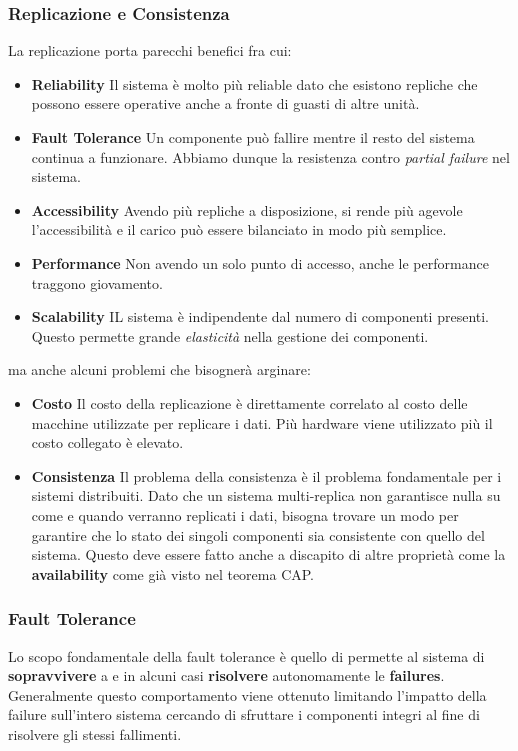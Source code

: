 		\subsubsection{Replicazione e Consistenza}
		La replicazione porta parecchi benefici fra cui:
		\begin{itemize}
			\item{\textbf{Reliability}}
			Il sistema è molto più reliable dato che esistono repliche che possono essere operative anche a fronte di guasti di altre unità.
			\item{\textbf{Fault Tolerance}}
			Un componente può fallire mentre il resto del sistema continua a funzionare. Abbiamo dunque la resistenza contro \textit{partial failure} nel sistema.
			\item{\textbf{Accessibility}}
			Avendo più repliche a disposizione, si rende più agevole l'accessibilità e il carico può essere bilanciato in modo più semplice.
			\item{\textbf{Performance}}
			Non avendo un solo punto di accesso, anche le performance traggono giovamento.
			\item{\textbf{Scalability}}
			IL sistema è indipendente dal numero di componenti presenti. Questo permette grande \textit{elasticità} nella gestione dei componenti.
		\end{itemize}
		ma anche alcuni problemi che bisognerà arginare:
		\begin{itemize}
			\item{\textbf{Costo}}
			Il costo della replicazione è direttamente correlato al costo delle macchine utilizzate per replicare i dati. Più hardware viene utilizzato più il costo collegato è elevato.
			\item{\textbf{Consistenza}}
			Il problema della consistenza è il problema fondamentale per i sistemi distribuiti. Dato che un sistema multi-replica non garantisce nulla su come e quando verranno replicati i dati, bisogna trovare un modo per garantire che lo stato dei singoli componenti sia consistente con quello del sistema. Questo deve essere fatto anche a discapito di altre proprietà come la \textbf{availability} come già visto nel teorema CAP. 
		\end{itemize}

    \subsubsection{Fault Tolerance}
    Lo scopo fondamentale della fault tolerance è quello di permette al sistema di \textbf{sopravvivere} a e in alcuni casi \textbf{risolvere} autonomamente le \textbf{failures}.
    Generalmente questo comportamento viene ottenuto limitando l'impatto della failure sull'intero sistema cercando di sfruttare i componenti integri al fine di risolvere gli stessi fallimenti.



